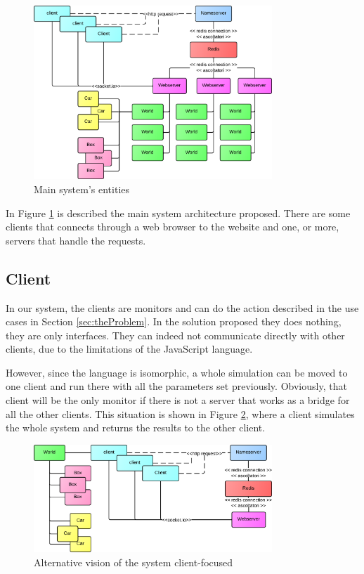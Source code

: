 \begin{figure}[H]
\centering %
\includegraphics[width=0.8\textwidth]{./img/SystemAnalysis/Entities.png}
\caption{Main system's entities}
\label{fig:entities}
\end{figure}

In Figure \ref{fig:entities} is described the main system architecture proposed. There are some clients that connects through a web browser to the website and one, or more, servers that handle the requests.

\subsection{Client}

In our system, the clients are monitors and can do the action described in the use cases in Section \ref{sec:theProblem}. In the solution proposed they does nothing, they are only interfaces. They can indeed not communicate directly with other clients, due to the limitations of the JavaScript language. 

However, since the language is isomorphic, a whole simulation can be moved to one client and run there with all the parameters set previously. Obviously, that client will be the only monitor if there is not a server that works as a bridge for all the other clients. This situation is shown in Figure \ref{fig:entitiesMagicClient}, where a client simulates the whole system and returns the results to the other client.

\begin{figure}[H]
\centering %
\includegraphics[width=0.8\textwidth]{./img/SystemAnalysis/EntitiesMagicClient.png}
\caption{Alternative vision of the system client-focused}
\label{fig:entitiesMagicClient}
\end{figure}

